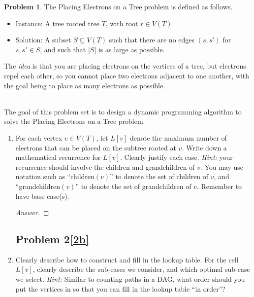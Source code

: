 \documentclass[11pt]{article}
\theoremstyle{definition}
\theoremstyle{definition}
\newtheorem{required}{Problem}
\theoremstyle{definition}
\begin{document}
\begin{required}
The \textsf{Placing Electrons on a Tree} problem is defined as follows. 
\begin{itemize}
\item \textsf{Instance:} A tree rooted tree $T$, with root $r \in V(T)$.
\item \textsf{Solution:} A subset $S \subseteq V(T)$ such that there are no edges $(s,s')$ for $s,s' \in S$, and such that $|S|$ is as large as possible.
\end{itemize}
The \emph{idea} is that you are placing electrons on the vertices of a tree, but electrons repel each other, so you cannot place two electrons adjacent to one another, with the goal being to place as many electrons as possible.

\noindent \\ The goal of this problem set is to design a dynamic programming algorithm to solve the \textsf{Placing Electrons on a Tree} problem.

\begin{enumerate}[label=(\alph*)]
\subsection{Problem 2\ref{2a}}
\item \label{2a} For each vertex $v \in V(T)$, let $L[v]$ denote the maximum number of electrons that can be placed on the subtree rooted at $v$. Write down a mathematical recurrence for $L[v]$. Clearly justify each case. \emph{Hint:} your recurrence should involve the children and grandchildren of $v$. You may use notation such as ``children$(v)$'' to denote the set of children of $v$, and ``grandchildren$(v)$'' to denote the set of grandchildren of $v$. Remember to have base case(s).

\begin{proof}[Answer]
\end{proof}



\newpage
\subsection{Problem 2\ref{2b}}
\item \label{2b} Clearly describe how to construct and fill in the lookup table. For the cell $L[v]$, clearly describe the sub-cases we consider, and which optimal sub-case we select. \emph{Hint:} Similar to counting paths in a DAG, what order should you put the vertices in so that you can fill in the lookup table ``in order''?


\end{enumerate}
\end{required}
\end{document}
